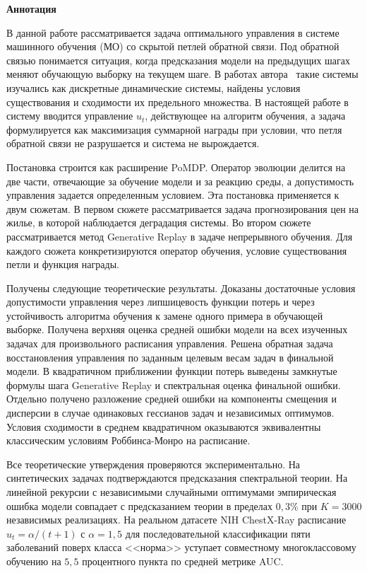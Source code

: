 \documentclass[a4paper,14pt,oneside,openany]{extarticle}
\begin{document}
\newpage
\begin{center}
    \Large{\textbf{Аннотация}}
\end{center}

В данной работе рассматривается задача оптимального управления в системе машинного обучения (МО) со скрытой петлей обратной связи. Под обратной связью понимается ситуация, когда предсказания модели на предыдущих шагах меняют обучающую выборку на текущем шаге. В работах автора~\cite{veprikov2025mathematical, veprikov2025properties} такие системы изучались как дискретные динамические системы, найдены условия существования и сходимости их предельного множества. В настоящей работе в систему вводится управление $u_t$, действующее на алгоритм обучения, а задача формулируется как максимизация суммарной награды при условии, что петля обратной связи не разрушается и система не вырождается.

Постановка строится как расширение PoMDP. Оператор эволюции делится на две части, отвечающие за обучение модели и за реакцию среды, а допустимость управления задается определенным условием. Эта постановка применяется к двум сюжетам. В первом сюжете рассматривается задача прогнозирования цен на жилье, в которой наблюдается деградация системы. Во втором сюжете рассматривается метод Generative Replay в задаче непрерывного обучения. Для каждого сюжета конкретизируются оператор обучения, условие существования петли и функция награды.

Получены следующие теоретические результаты. Доказаны достаточные условия допустимости управления через липшицевость функции потерь и через устойчивость алгоритма обучения к замене одного примера в обучающей выборке. Получена верхняя оценка средней ошибки модели на всех изученных задачах для произвольного расписания управления. Решена обратная задача восстановления управления по заданным целевым весам задач в финальной модели. В квадратичном приближении функции потерь выведены замкнутые формулы шага Generative Replay и спектральная оценка финальной ошибки. Отдельно получено разложение средней ошибки на компоненты смещения и дисперсии в случае одинаковых гессианов задач и независимых оптимумов. Условия сходимости в среднем квадратичном оказываются эквивалентны классическим условиям Роббинса-Монро на расписание.

Все теоретические утверждения проверяются экспериментально. На синтетических задачах подтверждаются предсказания спектральной теории. На линейной рекурсии с независимыми случайными оптимумами эмпирическая ошибка модели совпадает с предсказанием теории в пределах $0{,}3\%$ при $K = 3000$ независимых реализациях. На реальном датасете NIH ChestX-Ray расписание $u_t = \alpha/(t+1)$ с $\alpha = 1{,}5$ для последовательной классификации пяти заболеваний поверх класса <<норма>> уступает совместному многоклассовому обучению на $5{,}5$ процентного пункта по средней метрике AUC.
\end{document}

